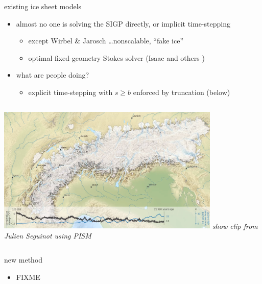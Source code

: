 \documentclass{beamer}
\begin{document}
\begin{frame}{existing ice sheet models}

\begin{itemize}
\item almost no one is solving the SIGP directly, or implicit time-stepping
    \begin{itemize}
    \item except Wirbel \& Jarosch \cite{WirbelJarosch2020} \dots nonscalable, ``fake ice''
    \item optimal fixed-geometry Stokes solver (Isaac and others \cite{IsaacStadlerGhattas2015})
    \end{itemize}
\item what are people doing?
    \begin{itemize}
    \item \alert{explicit time-stepping with $s \ge b$ enforced by truncation} (below)
    \end{itemize}
\end{itemize}

\medskip
\begin{columns}
        \hfill \includegraphics[width=0.8\textwidth]{figs/seguinot.png}
        \scriptsize \emph{show clip from Julien Seguinot using PISM}
\end{columns}
\end{frame}


\begin{frame}{new method}

\begin{itemize}
\item FIXME \cite{BuelerMitchell2022}
\end{itemize}
\end{frame}
\end{document}
